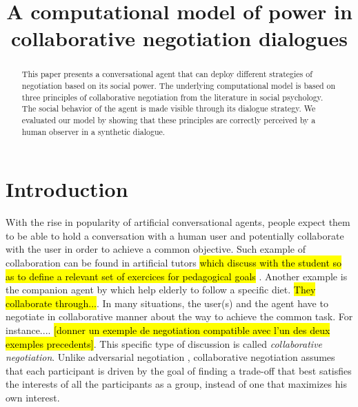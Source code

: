 \documentclass{llncs}
\begin{document}
		\title{\vskip -10pt A computational model of power in collaborative negotiation dialogues}
		
		\author{}
		\institute{}
		
		\maketitle
		
		\begin{abstract}
			This paper presents a conversational agent that can deploy different strategies of negotiation based on its social power. The underlying computational model is based on three principles of collaborative negotiation from the literature in social psychology. The social behavior of the agent is made visible through its dialogue strategy. We evaluated our model by showing that these principles are correctly perceived by a human observer in a synthetic dialogue. 
		\end{abstract}
		
		\section{Introduction}
		With the rise in popularity of artificial conversational agents, people expect them to be able to hold a conversation with a human user and potentially collaborate with the user in order to achieve a common objective. Such example of collaboration can be found in artificial tutors \hl{which discuss with the student so as to define a relevant set of exercices for pedagogical goals} \cite{gulz2011extending}. Another example is the companion agent by  \cite{kidd2005sociable} which help elderly to follow a specific diet. \hl{They collaborate through...}. In many situations, the user(s) and the agent have to negotiate in collaborative manner about the way to achieve the common task. For instance.... \hl{[donner un exemple de negotiation compatible avec l'un des deux exemples precedents]}. This specific type of discussion is called \emph{collaborative negotiation}. Unlike adversarial negotiation \cite{traum2008multi}, collaborative negotiation assumes that each participant is driven by the goal of finding a trade-off that best satisfies the interests of all the participants as a group, instead of one that maximizes his own interest\cite{sidner1994artificial,chu1995response}.
		
\end{document}
